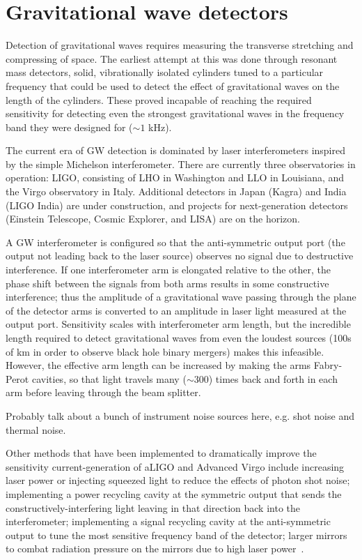 \chapter{Gravitational wave detectors}\label{ch:detectors}

Detection of gravitational waves requires measuring the transverse stretching and compressing of space. The earliest attempt at this was done through resonant mass detectors, solid, vibrationally isolated cylinders tuned to a particular frequency that could be used to detect the effect of gravitational waves on the length of the cylinders. These proved incapable of reaching the required sensitivity for detecting even the strongest gravitational waves in the frequency band they were designed for ($\sim1$ kHz).

The current era of \ac{GW} detection is dominated by laser interferometers inspired by the simple Michelson interferometer. There are currently three observatories in operation: \ac{LIGO}, consisting of \ac{LHO} in Washington and \ac{LLO} in Louisiana, and the Virgo observatory in Italy. Additional detectors in Japan (Kagra) and India (\ac{LIGO} India) are under construction, and projects for next-generation detectors (Einstein Telescope, Cosmic Explorer, and \ac{LISA}) are on the horizon.

A \ac{GW} interferometer is configured so that the anti-symmetric output port (the output not leading back to the laser source) observes no signal due to destructive interference. If one interferometer arm is elongated relative to the other, the phase shift between the signals from both arms results in some constructive interference; thus the amplitude of a gravitational wave passing through the plane of the detector arms is converted to an amplitude in laser light measured at the output port. Sensitivity scales with interferometer arm length, but the incredible length required to detect gravitational waves from even the loudest sources (100s of km in order to observe black hole binary mergers) makes this infeasible. However, the effective arm length can be increased by making the arms Fabry-Perot cavities, so that light travels many ($\sim300$) times back and forth in each arm before leaving through the beam splitter.

{\color{red}Probably talk about a bunch of instrument noise sources here, e.g. shot noise and thermal noise.}

Other methods that have been implemented to dramatically improve the sensitivity current-generation of \ac{aLIGO} and Advanced Virgo include increasing laser power or injecting squeezed light to reduce the effects of photon shot noise; implementing a power recycling cavity at the symmetric output that sends the constructively-interfering light leaving in that direction back into the interferometer; implementing a signal recycling cavity at the anti-symmetric output to tune the most sensitive frequency band of the detector; larger mirrors to combat radiation pressure on the mirrors due to high laser power~\citep{Creighton_2011}.

